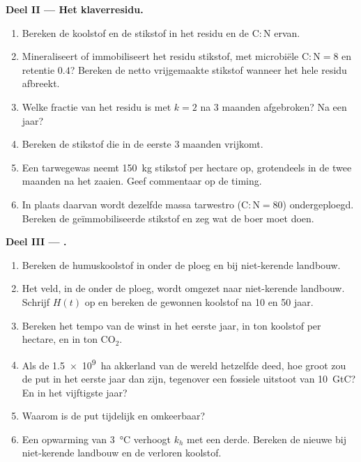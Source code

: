 \begin{problem}
\medskip
\noindent\textbf{Deel II --- Het klaverresidu.}
\begin{enumerate}[resume]
  \item Bereken de koolstof en de stikstof in het residu en de
        $\mathrm{C:N}$ ervan.
  \item Mineraliseert of immobiliseert het residu stikstof, met microbiële
        $\mathrm{C:N} = 8$ en retentie $0.4$? Bereken de netto vrijgemaakte
        stikstof wanneer het hele residu afbreekt.
  \item Welke fractie van het residu is met $k = 2$ na 3 maanden afgebroken?
        Na een jaar?
  \item Bereken de stikstof die in de eerste 3 maanden vrijkomt.
  \item Een tarwegewas neemt \qty{150}{kg} stikstof per hectare op,
        grotendeels in de twee maanden na het zaaien. Geef commentaar op de
        timing.
  \item In plaats daarvan wordt dezelfde massa tarwestro ($\mathrm{C:N} = 80$)
        ondergeploegd. Bereken de geïmmobiliseerde stikstof en
        zeg wat de boer moet doen.
\end{enumerate}

\medskip
\noindent\textbf{Deel III --- .}
\begin{enumerate}[resume]
  \item Bereken de humuskoolstof in  onder de ploeg en
        bij niet-kerende landbouw.
  \item Het veld, in de  onder de ploeg, wordt omgezet naar
        niet-kerende landbouw. Schrijf $H(t)$ op en bereken de gewonnen koolstof
        na 10 en 50 jaar.
  \item Bereken het tempo van de winst in het eerste jaar, in ton
        koolstof per hectare, en in ton $\mathrm{CO_2}$.
  \item Als de \qty{1.5e9}{ha} akkerland van de wereld hetzelfde deed,
        hoe groot zou de put in het eerste jaar dan zijn, tegenover een fossiele
        uitstoot van \qty{10}{GtC}? En in het vijftigste jaar?
  \item Waarom is de put tijdelijk en omkeerbaar?
  \item Een opwarming van \qty{3}{\celsius} verhoogt $k_h$ met een derde.
        Bereken de nieuwe  bij niet-kerende landbouw en de
        verloren koolstof.
\end{enumerate}


\end{problem}
